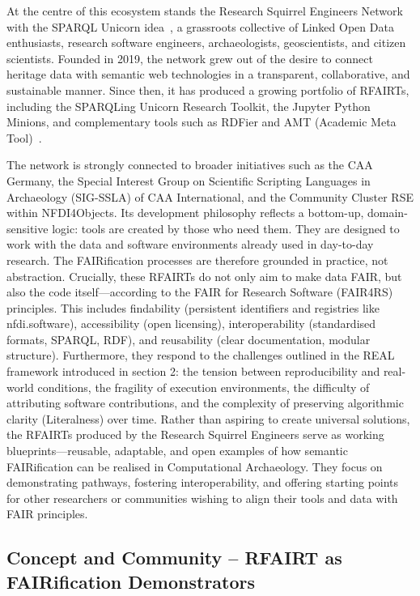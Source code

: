 \documentclass{eceasst}
\begin{document}
At the centre of this ecosystem stands the Research Squirrel Engineers Network with the SPARQL Unicorn idea~\cite{thiery_sparql_2020}, a grassroots collective of Linked Open Data enthusiasts, research software engineers, archaeologists, geoscientists, and citizen scientists. Founded in 2019, the network grew out of the desire to connect heritage data with semantic web technologies in a transparent, collaborative, and sustainable manner. Since then, it has produced a growing portfolio of RFAIRTs, including the SPARQLing Unicorn Research Toolkit, the Jupyter Python Minions, and complementary tools such as RDFier and AMT (Academic Meta Tool)~\cite{unold_academic_2019}. 

The network is strongly connected to broader initiatives such as the CAA Germany, the Special Interest Group on Scientific Scripting Languages in Archaeology (SIG-SSLA) of CAA International, and the Community Cluster RSE within NFDI4Objects. Its development philosophy reflects a bottom-up, domain-sensitive logic: tools are created by those who need them. They are designed to work with the data and software environments already used in day-to-day research. The FAIRification processes are therefore grounded in practice, not abstraction. Crucially, these RFAIRTs do not only aim to make data FAIR, but also the code itself—according to the FAIR for Research Software (FAIR4RS) principles. This includes findability (persistent identifiers and registries like nfdi.software), accessibility (open licensing), interoperability (standardised formats, SPARQL, RDF), and reusability (clear documentation, modular structure). Furthermore, they respond to the challenges outlined in the REAL framework introduced in section 2: the tension between reproducibility and real-world conditions, the fragility of execution environments, the difficulty of attributing software contributions, and the complexity of preserving algorithmic clarity (Literalness) over time. Rather than aspiring to create universal solutions, the RFAIRTs produced by the Research Squirrel Engineers serve as working blueprints—reusable, adaptable, and open examples of how semantic FAIRification can be realised in Computational Archaeology. They focus on demonstrating pathways, fostering interoperability, and offering starting points for other researchers or communities wishing to align their tools and data with FAIR principles.

\subsection{Concept and Community – RFAIRT as FAIRification Demonstrators}\label{sec:31}
\end{document}

